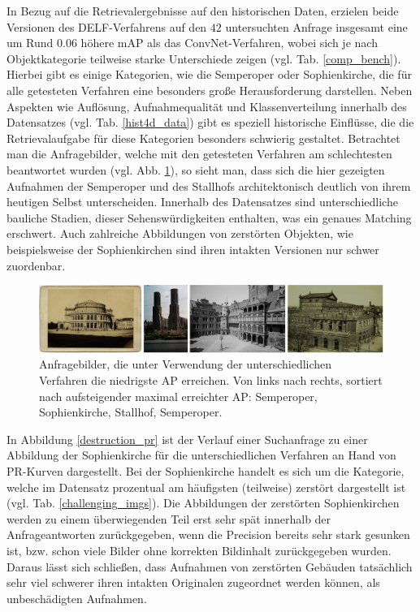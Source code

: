 In Bezug auf die Retrievalergebnisse auf den historischen Daten, erzielen beide Versionen des DELF-Verfahrens auf den $42$ untersuchten Anfrage insgesamt eine um Rund $0.06$ höhere mAP als das ConvNet-Verfahren, wobei sich je nach Objektkategorie teilweise starke Unterschiede zeigen (vgl. Tab. \ref{comp_bench}). Hierbei gibt es einige Kategorien, wie die Semperoper oder Sophienkirche, die für alle getesteten Verfahren eine besonders große Herausforderung darstellen. Neben Aspekten wie Auflösung, Aufnahmequalität und Klassenverteilung innerhalb des Datensatzes (vgl. Tab. \ref{hist4d_data}) gibt es speziell historische Einflüsse, die die Retrievalaufgabe für diese Kategorien besonders schwierig gestaltet. Betrachtet man die Anfragebilder, welche mit den getesteten Verfahren am schlechtesten beantwortet wurden (vgl. Abb. \ref{worst_queries}), so sieht man, dass sich die hier gezeigten Aufnahmen der Semperoper und des Stallhofs architektonisch deutlich von ihrem heutigen Selbst unterscheiden. Innerhalb des Datensatzes sind unterschiedliche bauliche Stadien, dieser Sehenswürdigkeiten enthalten, was ein genaues Matching erschwert. Auch zahlreiche Abbildungen von zerstörten Objekten, wie beispielsweise der Sophienkirchen sind ihren intakten Versionen nur schwer zuordenbar.  
\\
\begin{figure}[h]
\centering
\includegraphics[scale=0.40]{worst_queries}
\caption{Anfragebilder, die unter Verwendung der unterschiedlichen Verfahren die niedrigste AP erreichen. Von links nach rechts, sortiert nach aufsteigender maximal erreichter AP: Semperoper, Sophienkirche, Stallhof, Semperoper.}
\label{worst_queries}
\end{figure}
In Abbildung \ref{destruction_pr} ist der Verlauf einer Suchanfrage zu einer Abbildung der Sophienkirche für die unterschiedlichen Verfahren an Hand von PR-Kurven dargestellt. Bei der Sophienkirche handelt es sich um die Kategorie, welche im Datensatz prozentual am häufigsten (teilweise) zerstört dargestellt ist (vgl. Tab. \ref{challenging_imgs}). Die Abbildungen der zerstörten Sophienkirchen werden zu einem überwiegenden Teil erst sehr spät innerhalb der Anfrageantworten zurückgegeben, wenn die Precision bereits sehr stark gesunken ist, bzw. schon viele Bilder ohne korrekten Bildinhalt zurückgegeben wurden. Daraus lässt sich schließen, dass Aufnahmen von zerstörten Gebäuden tatsächlich sehr viel schwerer ihren intakten Originalen zugeordnet werden können, als unbeschädigten Aufnahmen.

